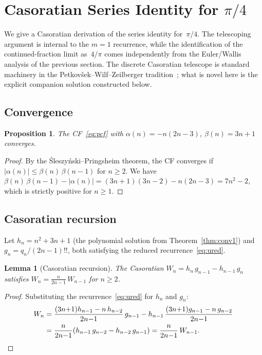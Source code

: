 \documentclass[11pt,a4paper]{article}
\theoremstyle{plain}
\newtheorem{lemma}[theorem]{Lemma}
\newtheorem{proposition}[theorem]{Proposition}
\theoremstyle{definition}
\theoremstyle{remark}
\newcommand{\dff}[1]{(#1)!!}
\begin{document}
\section{Casoratian Series Identity for \texorpdfstring{$\pi/4$}{pi/4}}%
\label{sec:casoratian}

We give a Casoratian derivation of the series identity for~$\pi/4$.
The telescoping argument is internal to the $m=1$ recurrence, while
the identification of the continued-fraction limit as~$4/\pi$ comes
independently from the Euler/Wallis analysis of the previous section.
The discrete Casoratian telescope is standard machinery in the
Petkov\v{s}ek--Wilf--Zeilberger tradition~\cite{PWZ}; what is
novel here is the explicit companion solution constructed below.

\subsection{Convergence}

\begin{proposition}\label{prop:conv}
The CF~\eqref{eq:pcf} with
$\alpha(n) = -n(2n{-}3)$, $\beta(n) = 3n{+}1$ converges.
\end{proposition}

\begin{proof}
By the \'Sleszy\'nski--Pringsheim theorem,
the CF converges if
$|\alpha(n)| \leq \beta(n)\,\beta(n{-}1)$ for $n \geq 2$.
We have
$\beta(n)\,\beta(n{-}1) - |\alpha(n)|
= (3n{+}1)(3n{-}2) - n(2n{-}3) = 7n^2 - 2$,
which is strictly positive for $n \geq 1$.
\end{proof}

\subsection{Casoratian recursion}

Let $h_n = n^2{+}3n{+}1$ (the polynomial solution from
Theorem~\ref{thm:conv1}) and $g_n = q_n/\dff{2n{-}1}$,
both satisfying the reduced recurrence~\eqref{eq:ured}.

\begin{lemma}[Casoratian recursion]\label{lem:cas_rec}
The Casoratian $W_n = h_n\,g_{n-1} - h_{n-1}\,g_n$ satisfies
$W_n = \frac{n}{2n{-}1}\,W_{n-1}$ for $n \geq 2$.
\end{lemma}

\begin{proof}
Substituting the recurrence~\eqref{eq:ured} for $h_n$ and $g_n$:
\begin{align*}
  W_n
  &= \frac{(3n{+}1)h_{n-1} - n\,h_{n-2}}{2n{-}1}\,g_{n-1}
    - h_{n-1}\,\frac{(3n{+}1)g_{n-1} - n\,g_{n-2}}{2n{-}1} \\
  &= \frac{n}{2n{-}1}(h_{n-1}\,g_{n-2} - h_{n-2}\,g_{n-1})
   = \frac{n}{2n{-}1}\,W_{n-1}.\qedhere
\end{align*}
\end{proof}
\end{document}
